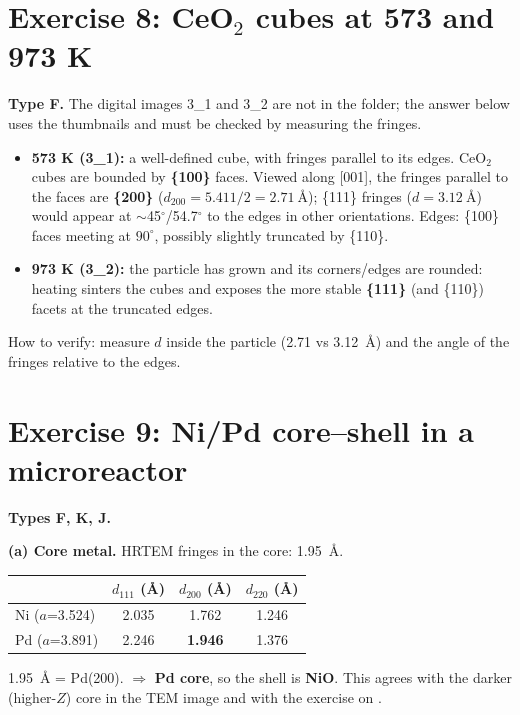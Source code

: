 \section{Exercise 8: CeO$_2$ cubes at 573 and 973 K}
\textbf{Type F.} The digital images 3\_1 and 3\_2 are not in the folder; the answer below uses the thumbnails and must be
checked by measuring the fringes.
\begin{itemize}
  \item \textbf{573 K (3\_1):} a well-defined cube, with fringes parallel to its edges. CeO$_2$ cubes are bounded by
        \textbf{\{100\}} faces. Viewed along [001], the fringes parallel to the faces are \textbf{\{200\}}
        ($d_{200} = 5.411/2 = \SI{2.71}{\angstrom}$); \{111\} fringes ($d = \SI{3.12}{\angstrom}$) would appear at $\sim$45$^\circ$/54.7$^\circ$ to
        the edges in other orientations. Edges: \{100\} faces meeting at $90^\circ$, possibly slightly truncated by \{110\}.
  \item \textbf{973 K (3\_2):} the particle has grown and its corners/edges are rounded: heating sinters the cubes and
        exposes the more stable \textbf{\{111\}} (and \{110\}) facets at the truncated edges.
\end{itemize}
How to verify: measure $d$ inside the particle (2.71 vs \SI{3.12}{\angstrom}) and the angle of the fringes relative to the edges.

\section{Exercise 9: Ni/Pd core--shell in a microreactor}
\textbf{Types F, K, J.}

\textbf{(a) Core metal.} HRTEM fringes in the core: \SI{1.95}{\angstrom}.
\begin{center}
\small
\begin{tabular}{@{}lccc@{}}
\toprule
 & $d_{111}$ (\AA) & $d_{200}$ (\AA) & $d_{220}$ (\AA) \\ \midrule
Ni ($a$=3.524) & 2.035 & 1.762 & 1.246 \\
Pd ($a$=3.891) & 2.246 & \textbf{1.946} & 1.376 \\
\bottomrule
\end{tabular}
\end{center}
\SI{1.95}{\angstrom} = Pd(200). $\Rightarrow$ \textbf{Pd core}, so the shell is \textbf{NiO}. This agrees with the darker (higher-$Z$) core
in the TEM image and with the exercise on .

